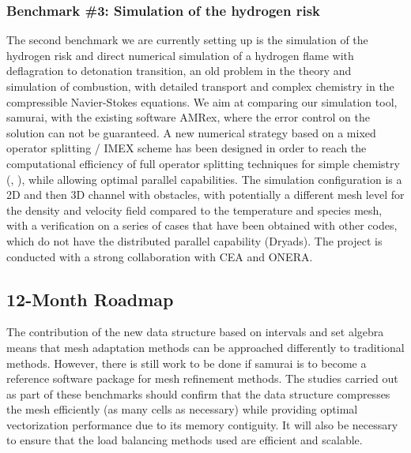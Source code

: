 \subsubsection{Benchmark \#3: Simulation of the hydrogen risk}

The second benchmark we are currently setting up is the simulation of the hydrogen risk and direct numerical simulation of a hydrogen flame with deflagration to detonation transition, an old problem in the theory and simulation of combustion, with detailed transport and complex chemistry in the compressible Navier-Stokes equations. We aim at comparing our simulation tool, samurai, with the existing software AMRex, where the error control on the solution can not be guaranteed. A new numerical strategy based on a mixed operator splitting / IMEX scheme has been designed in order to reach the computational efficiency of full operator splitting techniques for simple chemistry (\cite{duarte_adaptive_2011}, \cite{lecointre_hydrogen_2022}), while allowing optimal parallel capabilities. The simulation configuration is a 2D and then 3D channel with obstacles, with potentially a different mesh level for the density and velocity field compared to the temperature and species mesh, with a verification on a series of cases that have been obtained with other codes, which do not have the distributed parallel capability (Dryads). The project is conducted with a strong collaboration with CEA and ONERA.

\subsection{12-Month Roadmap}
\label{sec:WP1:Samurai:roadmap}

The contribution of the new data structure based on intervals and set algebra means that mesh adaptation methods can be approached differently to traditional methods. However, there is still work to be done if samurai is to become a reference software package for mesh refinement methods. The studies carried out as part of these benchmarks should confirm that the data structure compresses the mesh efficiently (as many cells as necessary) while providing optimal vectorization performance due to its memory contiguity. It will also be necessary to ensure that the load balancing methods used are efficient and scalable.

